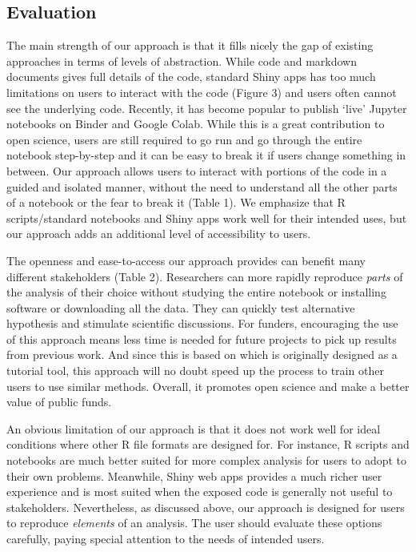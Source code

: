 \hypertarget{evaluation}{%
\subsection{Evaluation}\label{evaluation}}

The main strength of our approach is that it fills nicely the gap of
existing approaches in terms of levels of abstraction. While code and
markdown documents gives full details of the code, standard Shiny apps
has too much limitations on users to interact with the code (Figure 3)
and users often cannot see the underlying code. Recently, it has become
popular to publish `live' Jupyter notebooks on Binder and Google Colab.
While this is a great contribution to open science, users are still
required to go run and go through the entire notebook step-by-step and
it can be easy to break it if users change something in between. Our
approach allows users to interact with portions of the code in a guided
and isolated manner, without the need to understand all the other parts
of a notebook or the fear to break it (Table 1). We emphasize that R
scripts/standard notebooks and Shiny apps work well for their intended
uses, but our approach adds an additional level of accessibility to
users.

The openness and ease-to-access our approach provides can benefit many
different stakeholders (Table 2). Researchers can more rapidly reproduce
\emph{parts} of the analysis of their choice without studying the entire
notebook or installing software or downloading all the data. They can
quickly test alternative hypothesis and stimulate scientific
discussions. For funders, encouraging the use of this approach means
less time is needed for future projects to pick up results from previous
work. And since this is based on  which is originally
designed as a tutorial tool, this approach will no doubt speed up the
process to train other users to use similar methods. Overall, it
promotes open science and make a better value of public funds.

An obvious limitation of our approach is that it does not work well for
ideal conditions where other R file formats are designed for. For
instance, R scripts and notebooks are much better suited for more
complex analysis for users to adopt to their own problems. Meanwhile,
Shiny web apps provides a much richer user experience and is most suited
when the exposed code is generally not useful to stakeholders.
Nevertheless, as discussed above, our approach is designed for users to
reproduce \emph{elements} of an analysis. The user should evaluate these
options carefully, paying special attention to the needs of intended
users.

